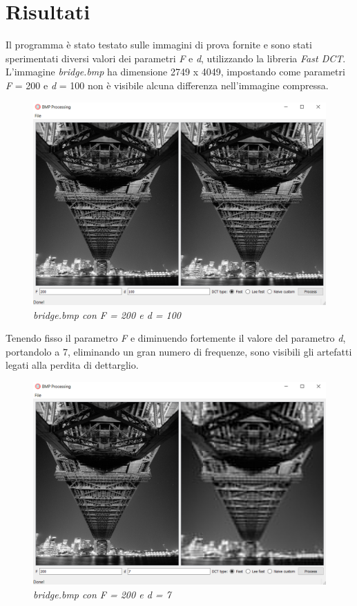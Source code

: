 \documentclass[a4paper,12pt]{report}
\begin{document}
\newpage
\section{Risultati}
Il programma è stato testato sulle immagini di prova fornite e sono stati sperimentati diversi valori dei parametri \textit{F} e \textit{d}, utilizzando la libreria \textit{Fast DCT}.\\

\noindent L'immagine \textit{bridge.bmp} ha dimensione 2749 x 4049, impostando come parametri  \textit{F} = 200 e \textit{d} = 100 non è visibile alcuna differenza nell'immagine compressa.

\begin{figure}[H]
\centering
\includegraphics[width=0.8\linewidth]{../img/bridge_200_100.png}
\caption{\textit{bridge.bmp con F = 200 e d = 100}}
\end{figure}

\noindent Tenendo fisso il parametro \textit{F} e diminuendo fortemente il valore del parametro \textit{d}, portandolo a 7, eliminando un gran numero di frequenze, sono visibili gli artefatti legati alla perdita di dettarglio.

\begin{figure}[H]
\centering
\includegraphics[width=0.8\linewidth]{../img/bridge_200_7.png}
\caption{\textit{bridge.bmp con F = 200 e d = 7}}
\end{figure}
\end{document}
